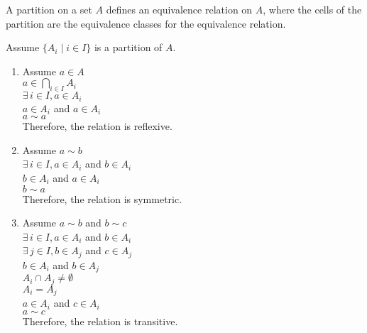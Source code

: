 \documentclass[letterpaper,12pt,fleqn]{article}
\begin{document}
\newpage
\begin{theorem}
A partition on a set $A$ defines an equivalence relation on $A$, where the
cells of the partition are the equivalence classes for the equivalence
relation.
\end{theorem}
\begin{theproof}
Assume $\{A_i\mid i\in I\}$ is a partition of $A$.
\begin{enumerate}
\item Assume $a\in A$ \\
$a\in\bigcap_{i\in I}A_i$ \\
$\exists\,i\in I,a\in A_i$ \\
$a\in A_i$ and $a\in A_i$ \\
$a\sim a$ \\
Therefore, the relation is reflexive.

\item Assume $a\sim b$ \\
$\exists\,i\in I,a\in A_i$ and $b\in A_i$ \\
$b\in A_i$ and $a\in A_i$ \\
$b\sim a$ \\
Therefore, the relation is symmetric.

\item Assume $a\sim b$ and $b\sim c$ \\
$\exists\,i\in I,a\in A_i$ and $b\in A_i$ \\
$\exists\,j\in I,b\in A_j$ and $c\in A_j$ \\
$b\in A_i$ and $b\in A_j$ \\
$A_i\cap A_j\ne\emptyset$ \\
$A_i=A_j$ \\
$a\in A_i$ and $c\in A_i$ \\
$a\sim c$ \\
Therefore, the relation is transitive.
\end{enumerate}
\end{theproof}
\end{document}
